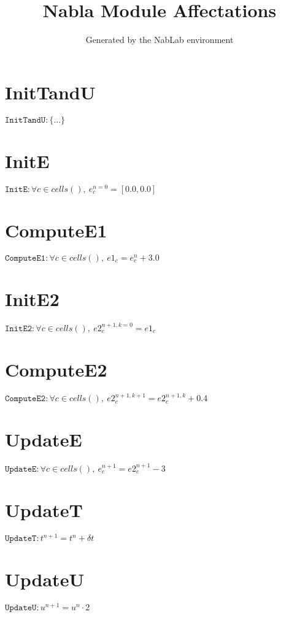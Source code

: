 \documentclass[11pt]{article}
\title{Nabla Module Affectations}
\author{Generated by the NabLab environment}
\begin{document}
\maketitle


\section{InitTandU}
$\texttt{InitTandU} : \{ ... \}$


\section{InitE}
$\texttt{InitE} : \forall{c\in cells()}, \ e^{n=0}_{c} = \left[0.0,0.0\right]$


\section{ComputeE1}
$\texttt{ComputeE1} : \forall{c\in cells()}, \ e1_{c} = e^{n}_{c} + 3.0$


\section{InitE2}
$\texttt{InitE2} : \forall{c\in cells()}, \ e2^{n+1, k=0}_{c} = e1_{c}$


\section{ComputeE2}
$\texttt{ComputeE2} : \forall{c\in cells()}, \ e2^{n+1, k+1}_{c} = e2^{n+1, k}_{c} + 0.4$


\section{UpdateE}
$\texttt{UpdateE} : \forall{c\in cells()}, \ e^{n+1}_{c} = e2^{n+1}_{c} - 3$


\section{UpdateT}
$\texttt{UpdateT} : t^{n+1} = t^{n} + \delta t$


\section{UpdateU}
$\texttt{UpdateU} : u^{n+1} = u^{n} \cdot 2$
\end{document}
